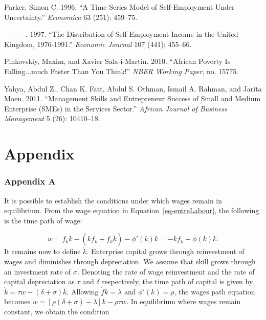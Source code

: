 \documentclass[
  a4paper,
  DIV=11,
  numbers=noendperiod]{scrartcl}
\newlength{\cslhangindent}
\newlength{\cslentryspacingunit} %
\newenvironment{CSLReferences}[2] %
 {%
  \setlength{\parindent}{0pt}
  \ifodd #1
  \let\oldpar\par
  \def\par{\hangindent=\cslhangindent\oldpar}
  \fi
  \setlength{\parskip}{#2\cslentryspacingunit}
 }%
 {}
\begin{document}
\begin{CSLReferences}{1}{0}
\leavevmode{}%
Parker, Simon C. 1996. {``A Time Series Model of Self-Employment Under
Uncertainty.''} \emph{Economica} 63 (251): 459--75.

\leavevmode{}%
---------. 1997. {``The Distribution of Self-Employment Income in the
United Kingdom, 1976-1991.''} \emph{Economic Journal} 107 (441):
455--66.

\leavevmode{}%
Pinkovskiy, Maxim, and Xavier Sala-i-Martin. 2010. {``African Poverty Is
Falling...much Faster Than You Think!''} \emph{NBER Working Paper}, no.
15775.

\leavevmode{}%
Yahya, Abdul Z., Chan K. Fatt, Abdul S. Othman, Ismail A. Rahman, and
Jarita Moen. 2011. {``Management Skills and Entrepreneur Success of
Small and Medium Enterprise (SMEs) in the Services Sector.''}
\emph{African Journal of Business Management} 5 (26): 10410--18.

\end{CSLReferences}

\newpage{}

\hypertarget{sec-appendix}{%
\section*{Appendix}\label{sec-appendix}}

\hypertarget{appendix-a}{%
\subsubsection*{Appendix A}\label{appendix-a}}

It is possible to establish the conditions under which wages remain in
equilibrium. From the wage equation in Equation~\ref{eq-entreLabour},
the following is the time path of wage:

\[
\dot{w}=f_k\dot{k} -(k\dot{f}_k + f_k\dot{k}) - \phi'(k)\dot{k}=-k\dot{f}_k-\phi(k)\dot{k}. \tag{A1}
\] It remains now to define \(\dot{k}\). Enterprise capital grows
through reinvestment of wages and diminishes through depreciation. We
assume that skill grows through an investment rate of \(\sigma\).
Denoting the rate of wage reinvestment and the rate of capital
depreciation as \(\tau\) and \(\delta\) respectively, the time path of
capital is given by \(\dot{k}=\tau w - (\delta + \sigma)k\). Allowing
\(\dot{f}k= \lambda\) and \(\phi'(k)=\rho\), the wages path equation
becomes \(\dot{w}=[\rho(\delta +\sigma)-\lambda]k-\rho \tau w.\) In
equilibrium where wages remain constant, we obtain the condition
\end{document}
